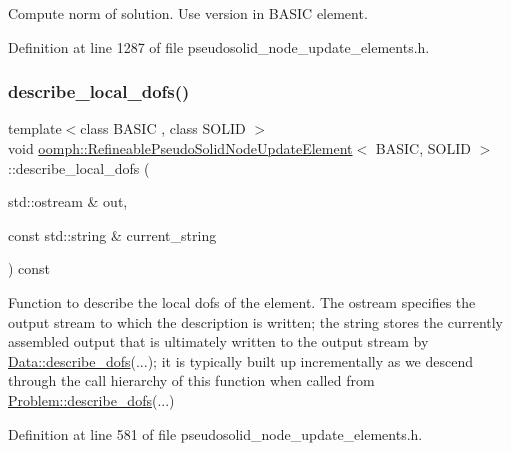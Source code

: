 Compute norm of solution. Use version in B\+A\+S\+IC element. 



Definition at line 1287 of file pseudosolid\+\_\+node\+\_\+update\+\_\+elements.\+h.

\mbox{\label{classoomph_1_1RefineablePseudoSolidNodeUpdateElement_ae8d1530df547c5d697c640d45cb6c941}} 
\subsubsection{\texorpdfstring{describe\+\_\+local\+\_\+dofs()}{describe\_local\_dofs()}}
{\footnotesize\ttfamily template$<$class B\+A\+S\+IC , class S\+O\+L\+ID $>$ \\
void \hyperlink{classoomph_1_1RefineablePseudoSolidNodeUpdateElement}{oomph\+::\+Refineable\+Pseudo\+Solid\+Node\+Update\+Element}$<$ B\+A\+S\+IC, S\+O\+L\+ID $>$\+::describe\+\_\+local\+\_\+dofs (\begin{DoxyParamCaption}\item[{std\+::ostream \&}]{out,  }\item[{const std\+::string \&}]{current\+\_\+string }\end{DoxyParamCaption}) const\hspace{0.3cm}{\ttfamily [inline]}}



Function to describe the local dofs of the element. The ostream specifies the output stream to which the description is written; the string stores the currently assembled output that is ultimately written to the output stream by \hyperlink{classoomph_1_1Data_a2dae16e2dcff9a40029f834c83364df5}{Data\+::describe\+\_\+dofs}(...); it is typically built up incrementally as we descend through the call hierarchy of this function when called from \hyperlink{classoomph_1_1Problem_abc103804eb319ae0b3d43870cc3e1eaf}{Problem\+::describe\+\_\+dofs}(...) 



Definition at line 581 of file pseudosolid\+\_\+node\+\_\+update\+\_\+elements.\+h.

